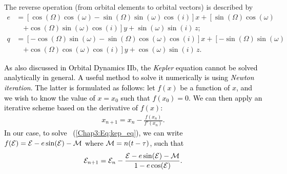 \documentclass[main.tex]{subfiles}
\begin{document}
\begin{tcolorbox}[sharp corners, colback=green!30, colframe=green!80!blue, title=Orbital Dynamics IV$^7$]
{The reverse operation (from orbital elements to orbital vectors) is described by
\begin{subequations}
\label{Chap3:Eq:elements_to_vec}
\begin{align}
\nonumber \unit{e} &= \left [ \cos(\Omega) \cos(\omega) - \sin(\Omega) \sin(\omega) \cos(i) \right ] \unit{x} + \left [ \sin(\Omega) \cos(\omega) \right. \\
&\quad \left. + \cos(\Omega) \sin(\omega) \cos(i) \right ] \unit{y} + \sin(\omega) \sin(i) \, \unit{z}; \\
\nonumber \unit{q} &= \left [ -\cos(\Omega) \sin(\omega) - \sin(\Omega) \cos(\omega) \cos(i) \right ] \unit{x} + \left [ -\sin(\Omega) \sin(\omega) \right. \\
&\quad \left. + \cos(\Omega) \cos(\omega) \cos(i) \right ] \unit{y} + \cos(\omega) \sin(i) \, \unit{z}.
\end{align}
\end{subequations}
}
\end{tcolorbox}

\begin{tcolorbox}[sharp corners, colback=green!30, colframe=green!80!blue, title=Orbital Dynamics IV$^7$ (continued)]
\par \textcolor{black}{As also discussed in Orbital Dynamics IIb, the {\it Kepler} equation cannot be solved analytically in general. A useful method to solve it numerically is using {\it Newton iteration}. The latter is formulated as follows: let $f(x)$ be a function of $x$, and we wish to know the value of $x=x_0$ such that $f(x_0)=0$. We can then apply an iterative scheme based on the derivative of $f(x)$: 
\begin{align}
x_{n+1} = x_n - \frac{f(x_n)}{f'(x_n)}.
\end{align}
In our case, to solve \Eq~(\ref{Chap3:Eq:kep_eq}), we can write $f(\mathcal{E}) = \mathcal{E} - e \sin(\mathcal{E}) - \mathcal{M}$ where $\mathcal{M} = n(t-\tau)$, such that
\begin{align}
\mathcal{E}_{n+1} = \mathcal{E}_n - \frac{\mathcal{E} - e \sin(\mathcal{E}) - \mathcal{M}}{1 - e \cos(\mathcal{E})}.
\end{align}
}
\end{tcolorbox}
\end{document}
